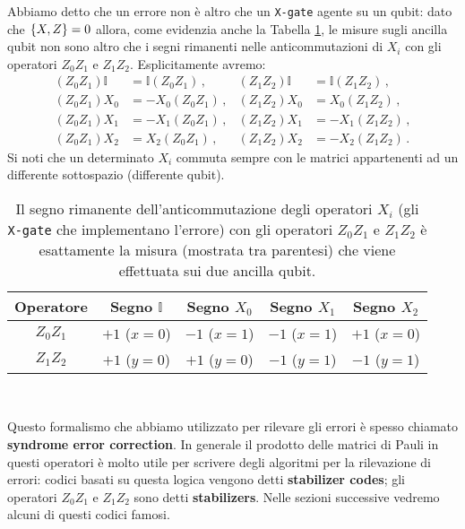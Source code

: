\noindent Abbiamo detto che un errore non è altro che un \texttt{X-gate} agente su un qubit: dato che $\acomm{X}{Z} = 0$ allora, come evidenzia anche la Tabella \ref{tab:acomm_ZZ}, le misure sugli ancilla qubit non sono altro che i segni rimanenti nelle anticommutazioni di $X_i$ con gli operatori $Z_0 Z_1$ e $Z_1 Z_2$. Esplicitamente avremo:
\begin{align*}
    (Z_0 Z_1) \mathbb{I} &= \mathbb{I} (Z_0 Z_1) \, , &(Z_1 Z_2) \mathbb{I} &= \mathbb{I} (Z_1 Z_2) \, , \\
    (Z_0 Z_1) X_0 &= - X_0 (Z_0 Z_1) \, , &(Z_1 Z_2) X_0 &= X_0 (Z_1 Z_2) \, , \\
    (Z_0 Z_1) X_1 &= - X_1 (Z_0 Z_1) \, , &(Z_1 Z_2) X_1 &= - X_1 (Z_1 Z_2) \, , \\
    (Z_0 Z_1) X_2 &= X_2 (Z_0 Z_1) \, , &(Z_1 Z_2) X_2 &= - X_2 (Z_1 Z_2) \, .
\end{align*}
Si noti che un determinato $X_i$ commuta sempre con le matrici appartenenti ad un differente sottospazio (differente qubit).

\begin{table}[!hb]
	\centering
    \begin{tabular}{c|cccc}
        \toprule
        Operatore & Segno $\mathbb{I}$ & Segno $X_0$ & Segno $X_1$ & Segno $X_2$ \\
        \midrule
        $Z_0 Z_1$ & $+1$ ($x = 0$) & $-1$ ($x = 1$) & $-1$ ($x = 1$) & $+1$ ($x = 0$) \\
        $Z_1 Z_2$ & $+1$ ($y = 0$) & $+1$ ($y = 0$) & $-1$ ($y = 1$) & $-1$ ($y = 1$) \\
        \bottomrule
    \end{tabular}\\
    \caption{Il segno rimanente dell'anticommutazione degli operatori $X_i$ (gli \texttt{X-gate} che implementano l'errore) con gli operatori $Z_0 Z_1$ e $Z_1 Z_2$ è esattamente la misura (mostrata tra parentesi) che viene effettuata sui due ancilla qubit.}
    \label{tab:acomm_ZZ}
\end{table}

\noindent Questo formalismo che abbiamo utilizzato per rilevare gli errori è spesso chiamato \textbf{syndrome error correction}. In generale il prodotto delle matrici di Pauli in questi operatori è molto utile per scrivere degli algoritmi per la rilevazione di errori: codici basati su questa logica vengono detti \textbf{stabilizer codes}; gli operatori $Z_0 Z_1$ e $Z_1 Z_2$ sono detti \textbf{stabilizers}. Nelle sezioni successive vedremo alcuni di questi codici famosi.

